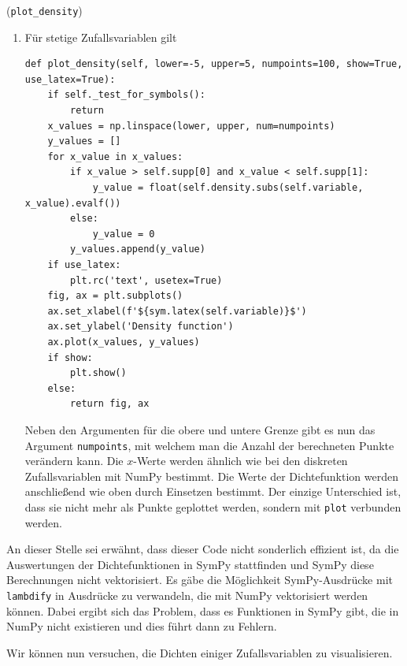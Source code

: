 \begin{Code}{(\lstinline|plot_density|)}
\begin{enumerate}[label=(\roman*)]
\item Für stetige Zufallsvariablen gilt
\begin{lstlisting}
def plot_density(self, lower=-5, upper=5, numpoints=100, show=True, use_latex=True):
    if self._test_for_symbols():
        return
    x_values = np.linspace(lower, upper, num=numpoints)
    y_values = []
    for x_value in x_values:
        if x_value > self.supp[0] and x_value < self.supp[1]:
            y_value = float(self.density.subs(self.variable, x_value).evalf())
        else:
            y_value = 0
        y_values.append(y_value)
    if use_latex:
        plt.rc('text', usetex=True)
    fig, ax = plt.subplots()
    ax.set_xlabel(f'${sym.latex(self.variable)}$')
    ax.set_ylabel('Density function')
    ax.plot(x_values, y_values)
    if show:
        plt.show()
    else:
        return fig, ax
\end{lstlisting}
Neben den Argumenten für die obere und untere Grenze gibt es nun das Argument \lstinline|numpoints|, mit welchem man die Anzahl der berechneten Punkte verändern kann. Die $x$-Werte werden ähnlich wie bei den diskreten Zufallsvariablen mit NumPy bestimmt. Die Werte der Dichtefunktion werden anschließend wie oben durch Einsetzen bestimmt. Der einzige Unterschied ist, dass sie nicht mehr als Punkte geplottet werden, sondern mit \lstinline|plot| verbunden werden.
\end{enumerate}
An dieser Stelle sei erwähnt, dass dieser Code nicht sonderlich effizient ist, da die Auswertungen der Dichtefunktionen in SymPy stattfinden und SymPy diese Berechnungen nicht vektorisiert. Es gäbe die Möglichkeit SymPy-Ausdrücke mit \lstinline|lambdify| in Ausdrücke zu verwandeln, die mit NumPy vektorisiert werden können. Dabei ergibt sich das Problem, dass es Funktionen in SymPy gibt, die in NumPy nicht existieren und dies führt dann zu Fehlern.
\end{Code}

Wir können nun versuchen, die Dichten einiger Zufallsvariablen zu visualisieren.

